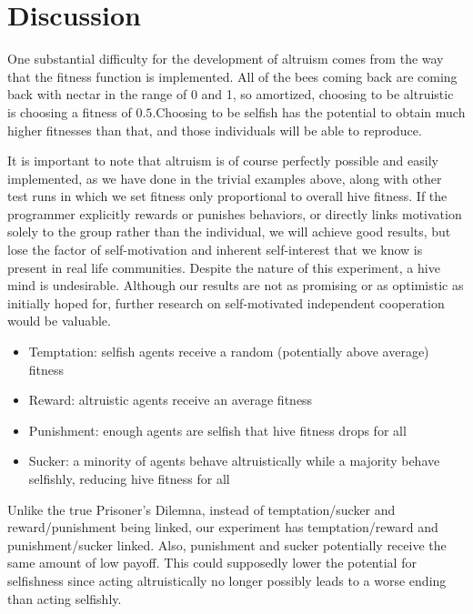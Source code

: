 \documentclass[11pt]{article}
\begin{document}


	\section{Discussion} %
	\label{sec:discussion}
		One substantial difficulty for the development of altruism comes from the way that the fitness function is implemented. All of the bees coming back are coming back with nectar in the range of 0 and 1, so amortized, choosing to be altruistic is choosing a fitness of $0.5$.Choosing to be selfish has the potential to obtain much higher
		fitnesses than that, and those individuals will be able to reproduce.

		It is important to note that altruism is of course perfectly possible and easily implemented, as we have done in the trivial examples above, along with other test runs in which we set fitness only proportional to overall hive fitness. If the programmer explicitly rewards or punishes behaviors, or directly links motivation solely to the group rather than the individual, we will achieve good results, but lose the factor of self-motivation and inherent self-interest that we know is present in real life communities. Despite the nature of this experiment, a hive mind is undesirable. Although our results are not as promising or as optimistic as initially hoped for, further research on self-motivated independent cooperation would be valuable. 

		\begin{itemize}
		\item Temptation: selfish agents receive a random (potentially above average) fitness
		\item Reward: altruistic agents receive an average fitness
		\item Punishment: enough agents are selfish that hive fitness drops for all
		\item Sucker: a minority of agents behave altruistically while a majority behave selfishly, reducing hive fitness for all
		\end{itemize}
		Unlike the true Prisoner's Dilemna, instead of temptation/sucker and reward/punishment being linked, our experiment has temptation/reward and punishment/sucker linked. Also, punishment and sucker potentially receive the same amount of low payoff. This could supposedly lower the potential for selfishness since acting altruistically no longer possibly leads to a worse ending than acting selfishly.
\end{document}

